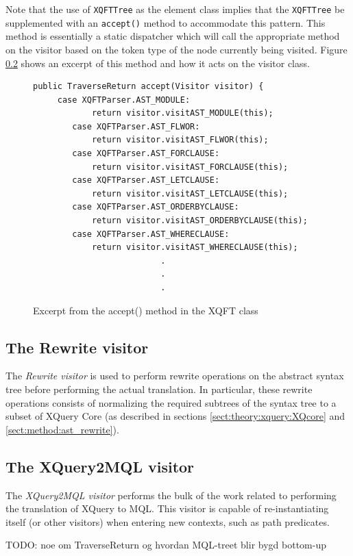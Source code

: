 Note that the use of \texttt{XQFTTree} as the element class implies that the
\texttt{XQFTTree} be supplemented with an \texttt{accept()} method to
accommodate this pattern. This method is essentially a static dispatcher which
will call the appropriate method on the visitor based on the token type of the
node currently being visited. Figure \ref{} shows an excerpt of this method and
how it acts on the visitor class.

\begin{figure}[htp]
\begin{center}
  \begin{Verbatim}	
public TraverseReturn accept(Visitor visitor) {
     case XQFTParser.AST_MODULE:
            return visitor.visitAST_MODULE(this);
        case XQFTParser.AST_FLWOR:
            return visitor.visitAST_FLWOR(this);
        case XQFTParser.AST_FORCLAUSE:
            return visitor.visitAST_FORCLAUSE(this);
        case XQFTParser.AST_LETCLAUSE:
            return visitor.visitAST_LETCLAUSE(this);
        case XQFTParser.AST_ORDERBYCLAUSE:
            return visitor.visitAST_ORDERBYCLAUSE(this);
        case XQFTParser.AST_WHERECLAUSE:
            return visitor.visitAST_WHERECLAUSE(this);
                          .
                          .
                          .
  \end{Verbatim}
  \caption{Excerpt from the accept() method in the XQFT class}
  \label{figureLabel}
\end{center}
\end{figure}

\subsection{The Rewrite visitor}
The \textit{Rewrite visitor} is used to perform rewrite operations on the
abstract syntax tree before performing the actual translation. In particular,
these rewrite operations consists of normalizing the required subtrees of the
syntax tree to a subset of XQuery Core (as described in sections
\ref{sect:theory:xquery:XQcore} and \ref{sect:method:ast_rewrite}).

\subsection{The XQuery2MQL visitor}
The \textit{XQuery2MQL visitor} performs the bulk of the work related to
performing the translation of XQuery to MQL. This visitor is capable of
re-instantiating itself (or other visitors) when entering new contexts, such as
path predicates.

TODO: noe om TraverseReturn og hvordan MQL-treet blir bygd bottom-up
